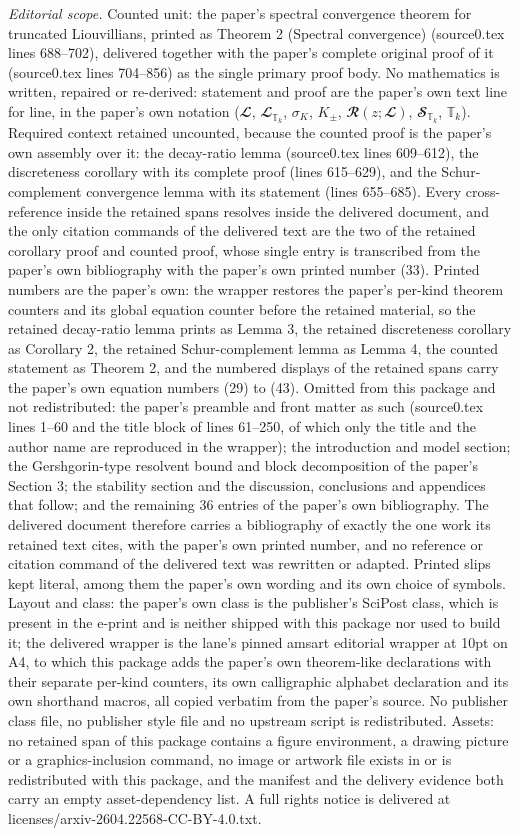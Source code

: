 \documentclass[10pt,a4paper]{amsart}
\newcommand{\LI}{{\mathbb T}}
\begin{document}
\noindent\textit{Editorial scope.} Counted unit: the paper's spectral convergence theorem for truncated Liouvillians, printed as Theorem 2 (Spectral convergence) (source0.tex lines 688--702), delivered together with the paper's complete original proof of it (source0.tex lines 704--856) as the single primary proof body. No mathematics is written, repaired or re-derived: statement and proof are the paper's own text line for line, in the paper's own notation ($\mathbfcal L$, $\mathbfcal L_{\LI_k}$, $\sigma_K$, $K_\pm$, $\mathbfcal R(z;\mathbfcal L)$, $\mathbfcal S_{\LI_k}$, $\LI_k$). Required context retained uncounted, because the counted proof is the paper's own assembly over it: the decay-ratio lemma (source0.tex lines 609--612), the discreteness corollary with its complete proof (lines 615--629), and the Schur-complement convergence lemma with its statement (lines 655--685). Every cross-reference inside the retained spans resolves inside the delivered document, and the only citation commands of the delivered text are the two of the retained corollary proof and counted proof, whose single entry is transcribed from the paper's own bibliography with the paper's own printed number (33). Printed numbers are the paper's own: the wrapper restores the paper's per-kind theorem counters and its global equation counter before the retained material, so the retained decay-ratio lemma prints as Lemma 3, the retained discreteness corollary as Corollary 2, the retained Schur-complement lemma as Lemma 4, the counted statement as Theorem 2, and the numbered displays of the retained spans carry the paper's own equation numbers (29) to (43). Omitted from this package and not redistributed: the paper's preamble and front matter as such (source0.tex lines 1--60 and the title block of lines 61--250, of which only the title and the author name are reproduced in the wrapper); the introduction and model section; the Gershgorin-type resolvent bound and block decomposition of the paper's Section 3; the stability section and the discussion, conclusions and appendices that follow; and the remaining 36 entries of the paper's own bibliography. The delivered document therefore carries a bibliography of exactly the one work its retained text cites, with the paper's own printed number, and no reference or citation command of the delivered text was rewritten or adapted. Printed slips kept literal, among them the paper's own wording and its own choice of symbols. Layout and class: the paper's own class is the publisher's SciPost class, which is present in the e-print and is neither shipped with this package nor used to build it; the delivered wrapper is the lane's pinned amsart editorial wrapper at 10pt on A4, to which this package adds the paper's own theorem-like declarations with their separate per-kind counters, its own calligraphic alphabet declaration and its own shorthand macros, all copied verbatim from the paper's source. No publisher class file, no publisher style file and no upstream script is redistributed. Assets: no retained span of this package contains a figure environment, a drawing picture or a graphics-inclusion command, no image or artwork file exists in or is redistributed with this package, and the manifest and the delivery evidence both carry an empty asset-dependency list. A full rights notice is delivered at licenses/arxiv-2604.22568-CC-BY-4.0.txt.
\end{document}
